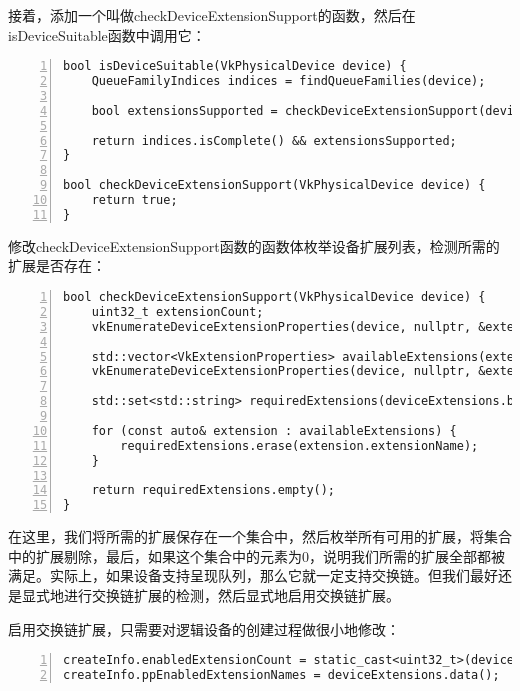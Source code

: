 \documentclass{ctexart}
\begin{document}
接着，添加一个叫做checkDeviceExtensionSupport的函数，然后在isDeviceSuitable函数中调用它：

\begin{lstlisting}[language={[ANSI]C},keywordstyle=\color{blue!70},commentstyle=\color{red!50!green!50!blue!50},frame=shadowbox, rulesepcolor=\color{red!20!green!20!blue!20},basicstyle=\small,numbers=left, numberstyle=\tiny,breaklines=true]
bool isDeviceSuitable(VkPhysicalDevice device) {
	QueueFamilyIndices indices = findQueueFamilies(device);

	bool extensionsSupported = checkDeviceExtensionSupport(device);

	return indices.isComplete() && extensionsSupported;
}

bool checkDeviceExtensionSupport(VkPhysicalDevice device) {
	return true;
}
\end{lstlisting}

修改checkDeviceExtensionSupport函数的函数体枚举设备扩展列表，检测所需的扩展是否存在：

\begin{lstlisting}[language={[ANSI]C},keywordstyle=\color{blue!70},commentstyle=\color{red!50!green!50!blue!50},frame=shadowbox, rulesepcolor=\color{red!20!green!20!blue!20},basicstyle=\small,numbers=left, numberstyle=\tiny,breaklines=true]
bool checkDeviceExtensionSupport(VkPhysicalDevice device) {
	uint32_t extensionCount;
	vkEnumerateDeviceExtensionProperties(device, nullptr, &extensionCount, nullptr);

	std::vector<VkExtensionProperties> availableExtensions(extensionCount);
	vkEnumerateDeviceExtensionProperties(device, nullptr, &extensionCount, availableExtensions.data());

	std::set<std::string> requiredExtensions(deviceExtensions.begin(), deviceExtensions.end());

	for (const auto& extension : availableExtensions) {
		requiredExtensions.erase(extension.extensionName);
	}

	return requiredExtensions.empty();
}
\end{lstlisting}

在这里，我们将所需的扩展保存在一个集合中，然后枚举所有可用的扩展，将集合中的扩展剔除，最后，如果这个集合中的元素为0，说明我们所需的扩展全部都被满足。实际上，如果设备支持呈现队列，那么它就一定支持交换链。但我们最好还是显式地进行交换链扩展的检测，然后显式地启用交换链扩展。

启用交换链扩展，只需要对逻辑设备的创建过程做很小地修改：

\begin{lstlisting}[language={[ANSI]C},keywordstyle=\color{blue!70},commentstyle=\color{red!50!green!50!blue!50},frame=shadowbox, rulesepcolor=\color{red!20!green!20!blue!20},basicstyle=\small,numbers=left, numberstyle=\tiny,breaklines=true]
createInfo.enabledExtensionCount = static_cast<uint32_t>(deviceExtensions.size());
createInfo.ppEnabledExtensionNames = deviceExtensions.data();
\end{lstlisting}
\end{document}
